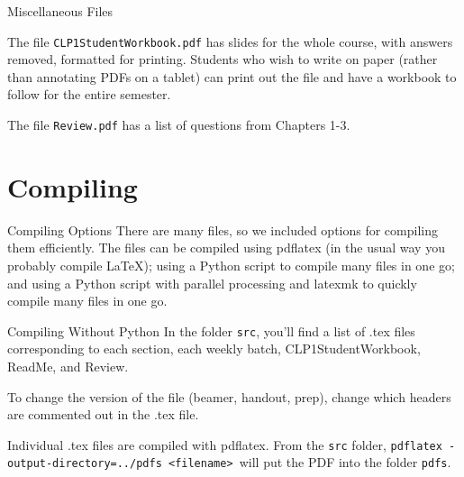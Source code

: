 \documentclass[10pt]{beamer}
\begin{document}
\begin{frame}{Miscellaneous Files}

The file \texttt{CLP1StudentWorkbook.pdf} has slides for the whole course, with answers removed, formatted for printing. Students who wish to write on paper (rather than annotating PDFs on a tablet) can print out the file and have a workbook to follow for the entire semester.\vfill

The file \texttt{Review.pdf} has a list of questions from Chapters 1-3.
\vfill

\end{frame}
\section{Compiling}
\frame{\tableofcontents[currentsection]}
\begin{frame}{Compiling Options}
There are many files, so we included options for compiling them efficiently. The files can be compiled using pdflatex (in the usual way you probably compile LaTeX); using a Python script to compile many files in one go; and using a Python script with parallel processing and latexmk to quickly compile many files in one go.
\end{frame}
\begin{frame}{Compiling Without Python}
In the folder \texttt{src}, you'll find a list of .tex files corresponding to each section, each weekly batch, CLP1StudentWorkbook, ReadMe, and Review. 
\vfill

To change the version of the file (beamer, handout, prep), change which headers are commented out in the .tex file.

\vfill

Individual .tex files are compiled with pdflatex. From the \texttt{src} folder, \texttt{pdflatex -output-directory=../pdfs  <filename> }will put the PDF into the folder \texttt{pdfs}.
\end{frame}
\end{document}
